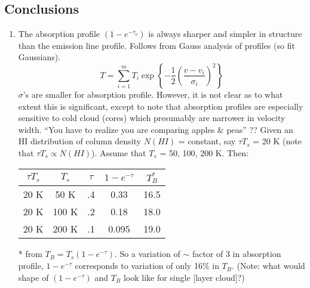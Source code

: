 \documentclass[12pt]{article}
\newcommand{\mar}[1]{\hspace{0pt}\marginpar{-\textcolor{black}{#1}-}}
\newcommand{\mynotes}[1]{\textcolor{mygreen}{#1}}
\begin{document}
\subsection{Conclusions}
\mar{45}
\begin{enumerate}
    \item The absorption profile $(1 - {e}^{-\tau_{\nu}})$ is always
        sharper and simpler in structure than the emission line profile.
        Follows from Gauss analysis of profiles (so fit Gaussians).
        \[
            T = \sum_{i=1}^{m}{
                T_{i} \exp \left\{ -\frac{1}{2} \left(
                    \frac{v - v_{i}}{\sigma_{i}} \right)^{2}
                \right\}}
            \]
        $\sigma$'s are smaller for absorption profile. However, it is not
        clear as to what extent this is significant, except to note that
        absorption profiles are especially sensitive to cold cloud (cores)
        which presumably are narrower in velocity width.
        ``You have to realize you are comparing apples \& peas'' \mynotes{??}
        Given an HI distribution of column density $N(HI)$ = constant, say
        $\tau T_{s}$ = 20 K (note that $\tau T_{s} \propto N(HI)$).
        Assume that $T_{s}$ = 50, 100, 200 K. Then:
        \begin{center}
            \begin{tabular}{c c c c c}
                $\tau T_{s}$ & $T_{s}$ & $\tau$ & $1-e^{-\tau}$ & $T_{B}^{*}$\\
                \hline
                20 K & 50 K & .4 & 0.33 & 16.5\\
                20 K & 100 K & .2 & 0.18 & 18.0\\
                20 K & 200 K & .1 & 0.095 & 19.0\\
            \end{tabular}
        \end{center}
        * from $T_{B} = T_{s} (1-e^{-\tau})$. So a variation of $\sim$
        factor of 3 in absorption profile, $1-e^{-\tau}$ corresponds to
        variation of only 16\% in $T_{B}$. (Note: what would shape of
        $(1-e^{-\tau})$ and $T_{B}$ look like for single [layer cloud]?)


\end{enumerate}
\end{document}
